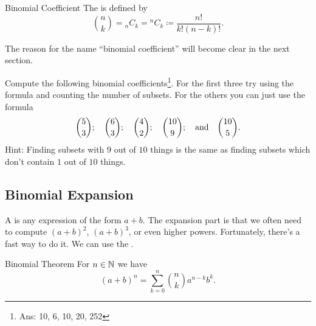 \documentclass[fleqn]{LectureClass/LectureClass}
\begin{document}
     \begin{dfn}{Binomial Coefficient}{}
         The  is defined by
         \begin{equation}
             \binom{n}{k} = {}_nC_k = {}^nC_k \coloneq \frac{n!}{k!(n - k)!}.
         \end{equation}
     \end{dfn}
     
     The reason for the name \enquote{binomial coefficient} will become clear in the next section.
     
     \begin{problem}{}{}
         Compute the following binomial coefficients\footnote{Ans: 10, 6, 10, 20, 252}.
         For the first three try using the formula and counting the number of subsets.
         For the others you can just use the formula
         \begin{equation}
             \binom{5}{3}; \quad \binom{6}{3}; \quad \binom{4}{2}; \quad \binom{10}{9}; \quad\text{and}\quad \binom{10}{5}.
         \end{equation}
         Hint: Finding subsets with \(9\) out of \(10\) things is the same as finding subsets which don't contain \(1\) out of \(10\) things.
     \end{problem}
     
     \subsection{Binomial Expansion}
     A  is any expression of the form \(a + b\).
     The expansion part is that we often need to compute \((a + b)^2\), \((a + b)^3\), or even higher powers.
     Fortunately, there's a fast way to do it.
     We can use the .
     
     \begin{thm}{Binomial Theorem}{}
         For \(n \in \mathbb{N}\) we have
         \begin{equation}
             (a + b)^n = \sum_{k=0}^n \binom{n}{k} a^{n-k}b^k.
         \end{equation}
     \end{thm}
     
\end{document}
